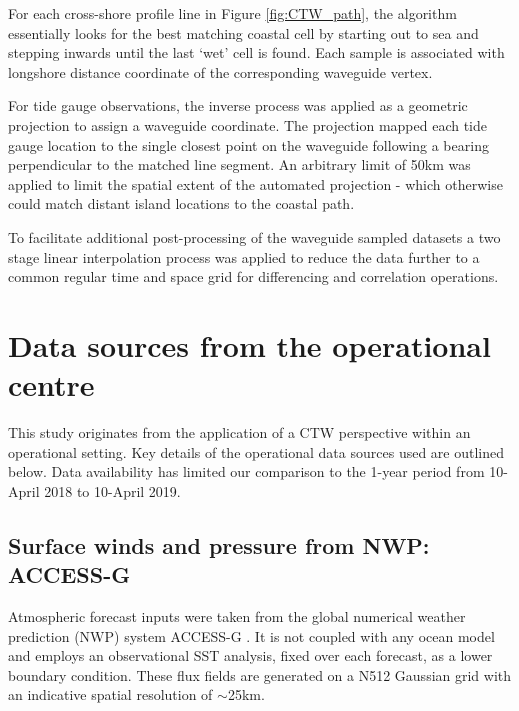 For each cross-shore profile line in Figure \ref{fig:CTW_path}, the algorithm essentially looks for the best matching coastal cell by starting out to sea and stepping inwards until the last `wet' cell is found.
Each sample is associated with longshore distance coordinate of the corresponding waveguide vertex.

For tide gauge observations, the inverse process was applied as a geometric projection to assign a waveguide coordinate. 
The projection mapped each tide gauge location to the single closest point on the waveguide following a bearing perpendicular to the matched line segment. 
An arbitrary limit of 50km was applied to limit the spatial extent of the automated projection - which otherwise could match distant island locations to the coastal path. 

To facilitate additional post-processing of the waveguide sampled datasets a two stage linear interpolation process was applied to reduce the data further to a common regular time and space grid for differencing and correlation operations.  

\section{Data sources from the operational centre}

This study originates from the application of a CTW perspective within an operational setting.
Key details of the operational data sources used are outlined below.
Data availability has limited our comparison to the 1-year period from 10-April 2018 to 10-April 2019.

\subsection{Surface winds and pressure from NWP: ACCESS-G }
\label{sec:access}
Atmospheric forecast inputs were taken from the global numerical weather prediction (NWP) system ACCESS-G \citep{BureauofMeterology:C8IaJ2Qq}.
It is not coupled with any ocean model and employs an observational SST analysis, fixed over each forecast, as a lower boundary condition.
These flux fields are generated on a N512 Gaussian grid with an indicative spatial resolution of $\sim$25km. 

